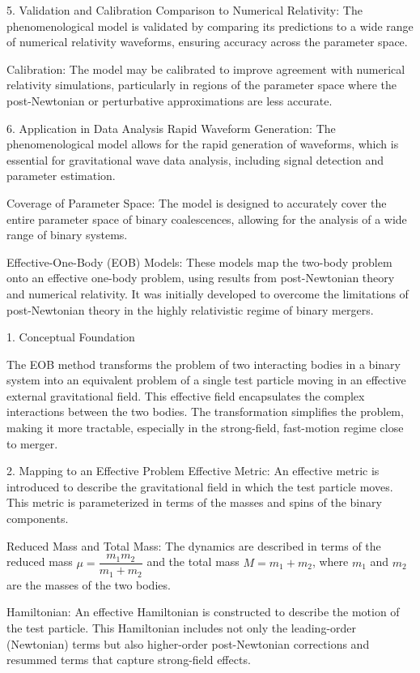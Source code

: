 5. Validation and Calibration
    Comparison to Numerical Relativity: The phenomenological model is validated by comparing its predictions to a wide range of numerical relativity waveforms, ensuring accuracy across the parameter space.

    Calibration: The model may be calibrated to improve agreement with numerical relativity simulations, particularly in regions of the parameter space where the post-Newtonian or perturbative approximations are less accurate.

6. Application in Data Analysis
    Rapid Waveform Generation: The phenomenological model allows for the rapid generation of waveforms, which is essential for gravitational wave data analysis, including signal detection and parameter estimation.
    
    Coverage of Parameter Space: The model is designed to accurately cover the entire parameter space of binary coalescences, allowing for the analysis of a wide range of binary systems.


Effective-One-Body (EOB) Models: These models map the two-body problem onto an effective one-body problem, using results from post-Newtonian theory and numerical relativity. It was initially developed to overcome the limitations of post-Newtonian theory in the highly relativistic regime of binary mergers. 

1. Conceptual Foundation

The EOB method transforms the problem of two interacting bodies in a binary system into an equivalent problem of a single test particle moving in an effective external gravitational field. This effective field encapsulates the complex interactions between the two bodies. The transformation simplifies the problem, making it more tractable, especially in the strong-field, fast-motion regime close to merger.

2. Mapping to an Effective Problem
    Effective Metric: An effective metric is introduced to describe the gravitational field in which the test particle moves. This metric is parameterized in terms of the masses and spins of the binary components.

    Reduced Mass and Total Mass: The dynamics are described in terms of the reduced mass $\mu=\dfrac{m_1m_2}{m_1+m_2}$ and the total mass $M=m_1+m_2$, where $m_1$ and $m_2$ are the masses of the two bodies.

    Hamiltonian: An effective Hamiltonian is constructed to describe the motion of the test particle. This Hamiltonian includes not only the leading-order (Newtonian) terms but also higher-order post-Newtonian corrections and resummed terms that capture strong-field effects.

